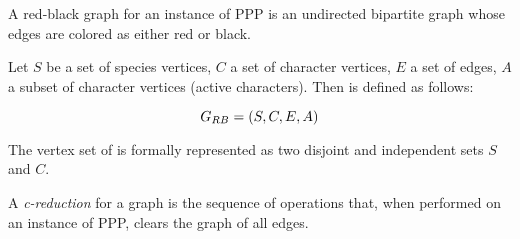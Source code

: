 A red-black graph for an instance of PPP is an undirected bipartite graph whose edges are colored as either red or black.

\begin{definition}\label{def:grb}
  Let $S$ be a set of species vertices, $C$ a set of character vertices, $E$ a set of edges, $A$ a subset of character vertices (active characters).
  Then \grb{} is defined as follows:

  \[ G_{RB}{} = (S, C, E, A) \]

  The vertex set of \grb{} is formally represented as two disjoint and independent sets $S$ and $C$.
\end{definition}


A \textit{c-reduction} for a graph \grb{} is the sequence of operations that, when performed on an instance of PPP, clears the graph of all edges.
